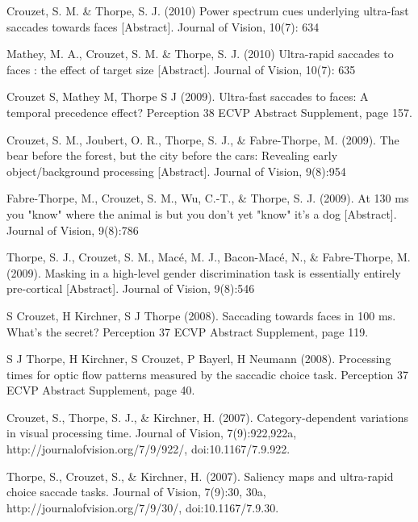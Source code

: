 \documentclass[margin,line]{resume}
\begin{document}
\begin{resume}
\vspace{-2mm} Crouzet, S. M. \& Thorpe, S. J. (2010) Power spectrum cues underlying ultra-fast saccades towards faces [Abstract]. Journal of Vision, 10(7): 634

\vspace{-2mm} Mathey, M. A., Crouzet, S. M. \& Thorpe, S. J. (2010) Ultra-rapid saccades to faces : the effect of target size [Abstract]. Journal of Vision, 10(7): 635

\vspace{-2mm} Crouzet S, Mathey M, Thorpe S J (2009). Ultra-fast saccades to faces: A temporal precedence effect? Perception 38 ECVP Abstract Supplement, page 157.

\vspace{-2mm} Crouzet, S. M., Joubert, O. R., Thorpe, S. J., \& Fabre-Thorpe, M. (2009). The bear before the forest, but the city before the cars: Revealing early object/background processing [Abstract]. Journal of Vision, 9(8):954

\vspace{-2mm} Fabre-Thorpe, M., Crouzet, S. M., Wu, C.-T., \& Thorpe, S. J. (2009). At 130 ms you "know" where the animal is but you don't yet "know" it's a dog [Abstract]. Journal of Vision, 9(8):786

\vspace{-2mm} Thorpe, S. J., Crouzet, S. M., Macé, M. J., Bacon-Macé, N., \& Fabre-Thorpe, M. (2009). Masking in a high-level gender discrimination task is essentially entirely pre-cortical [Abstract]. Journal of Vision, 9(8):546

\vspace{-2mm} S Crouzet, H Kirchner, S J Thorpe (2008). Saccading towards faces in 100 ms. What's the secret? Perception 37 ECVP Abstract Supplement, page 119. 

\vspace{-2mm} S J Thorpe, H Kirchner, S Crouzet, P Bayerl, H Neumann (2008). Processing times for optic flow patterns measured by the saccadic choice task. Perception 37 ECVP Abstract Supplement, page 40.

\vspace{-2mm} Crouzet, S., Thorpe, S. J., \& Kirchner, H. (2007). Category-dependent variations in visual processing time. Journal of Vision, 7(9):922,922a, http://journalofvision.org/7/9/922/, doi:10.1167/7.9.922.

\vspace{-2mm} Thorpe, S., Crouzet, S., \& Kirchner, H. (2007). Saliency maps and ultra-rapid choice saccade tasks. Journal of Vision, 7(9):30, 30a, http://journalofvision.org/7/9/30/, doi:10.1167/7.9.30.


\end{resume}
\end{document}
